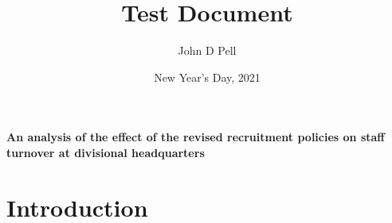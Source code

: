 \documentclass[12pt,1in]{gWmaths}
\author{John D Pell}
\title{Test Document}
\date{New Year's Day, 2021}
\begin{document}
	\maketitle
	\begin{abstract}
		\blindtext
	\end{abstract}

\tableofcontents
\listoffigures
\listoftables

\paragraph[Effect on staff turnover]{An analysis of the
effect of the revised recruitment policies on staff
turnover at divisional headquarters}

{}
\section*{Introduction}

	\blinddocument
\end{document}
